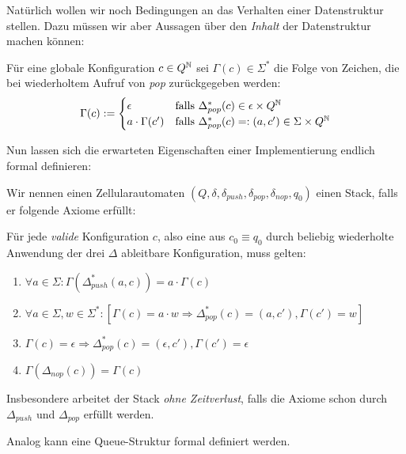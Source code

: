 \documentclass{article}
\begin{document}
Natürlich wollen wir noch Bedingungen an das Verhalten einer Datenstruktur stellen. Dazu müssen wir aber Aussagen über den \emph{Inhalt} der Datenstruktur machen können:
\begin{definition}
    Für eine globale Konfiguration $c \in Q^{\mathbb{N}}$ sei $\Gamma(c) \in \Sigma^*$ die Folge von Zeichen, die bei wiederholtem Aufruf von \emph{pop} zurückgegeben werden:
    $$ \Gamma(c) := \begin{cases}
        \epsilon &\text{falls } \Delta^*_{pop}(c) \in \epsilon \times Q^{\mathbb{N}} \\
        a \cdot \Gamma(c') &\text{falls }\Delta^*_{pop}(c)=:(a,c') \in \Sigma \times Q^{\mathbb{N}}
    \end{cases} $$
\end{definition}

Nun lassen sich die erwarteten Eigenschaften einer Implementierung endlich formal definieren:
\begin{definition}
    Wir nennen einen Zellularautomaten $(Q, \delta, \delta_{push}, \delta_{pop}, \delta_{nop}, q_0)$ einen Stack, falls er folgende Axiome erfüllt:

    Für jede \emph{valide} Konfiguration $c$, also eine aus $c_0 \equiv q_0$ durch beliebig wiederholte Anwendung der drei $\Delta$ ableitbare Konfiguration, muss gelten:
    \begin{enumerate}
        \item $\forall a \in \Sigma: \Gamma(\Delta^*_{push}(a,c)) = a \cdot \Gamma(c)$
        \item $\forall a \in \Sigma, w \in \Sigma^*: \left[ \Gamma(c) = a \cdot w \Rightarrow \Delta^*_{pop}(c) = (a,c'), \Gamma(c') = w \right]$
        \item $\Gamma(c) = \epsilon \Rightarrow \Delta^*_{pop}(c) = (\epsilon,c'), \Gamma(c') = \epsilon$
        \item $\Gamma(\Delta_{nop}(c)) = \Gamma(c)$
    \end{enumerate}
    Insbesondere arbeitet der Stack \emph{ohne Zeitverlust}, falls die Axiome schon durch $\Delta_{push}$ und $\Delta_{pop}$ erfüllt werden.
\end{definition}

Analog kann eine Queue-Struktur formal definiert werden.
\end{document}
